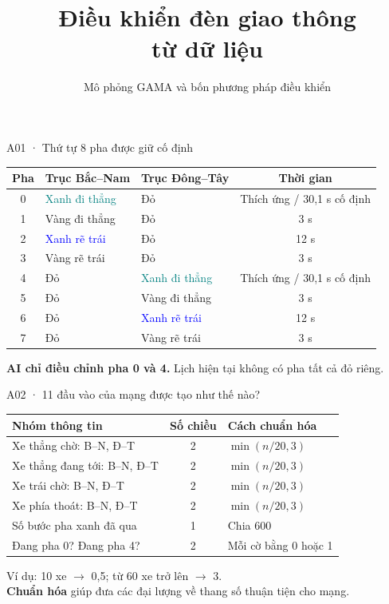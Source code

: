 \documentclass[aspectratio=169,10pt]{beamer}
\title{Điều khiển đèn giao thông\\từ dữ liệu}
\subtitle{Mô phỏng GAMA và bốn phương pháp điều khiển}
\date{}
\begin{document}
\begin{frame}{A01 · Thứ tự 8 pha được giữ cố định}
\relax

\begin{tabular}{@{}cllc@{}}\toprule
Pha & Trục Bắc–Nam & Trục Đông–Tây & Thời gian\\\midrule
0 & \textcolor{teal}{Xanh đi thẳng} & Đỏ & Thích ứng / 30,1 s cố định\\
1 & Vàng đi thẳng & Đỏ & 3 s\\
2 & \textcolor{blue}{Xanh rẽ trái} & Đỏ & 12 s\\
3 & Vàng rẽ trái & Đỏ & 3 s\\
4 & Đỏ & \textcolor{teal}{Xanh đi thẳng} & Thích ứng / 30,1 s cố định\\
5 & Đỏ & Vàng đi thẳng & 3 s\\
6 & Đỏ & \textcolor{blue}{Xanh rẽ trái} & 12 s\\
7 & Đỏ & Vàng rẽ trái & 3 s\\\bottomrule
\end{tabular}\par
\vspace{.25cm}
\textbf{AI chỉ điều chỉnh pha 0 và 4.} Lịch hiện tại không có pha tất cả đỏ riêng.

\end{frame}
\begin{frame}{A02 · 11 đầu vào của mạng được tạo như thế nào?}
\relax

\begin{tabular}{@{}P{7.2cm}cl@{}}\toprule
Nhóm thông tin & Số chiều & Cách chuẩn hóa\\\midrule
Xe thẳng chờ: B–N, Đ–T & 2 & $\min(n/20,3)$\\
Xe thẳng đang tới: B–N, Đ–T & 2 & $\min(n/20,3)$\\
Xe trái chờ: B–N, Đ–T & 2 & $\min(n/20,3)$\\
Xe phía thoát: B–N, Đ–T & 2 & $\min(n/20,3)$\\
Số bước pha xanh đã qua & 1 & Chia 600\\
Đang pha 0? Đang pha 4? & 2 & Mỗi cờ bằng 0 hoặc 1\\\bottomrule
\end{tabular}\par
\vspace{.3cm}
Ví dụ: 10 xe $\rightarrow$ 0,5; từ 60 xe trở lên $\rightarrow$ 3.\\[.15cm]
\textbf{Chuẩn hóa} giúp đưa các đại lượng về thang số thuận tiện cho mạng.

\end{frame}
\end{document}
